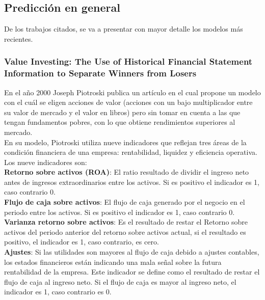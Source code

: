 \subsection{Predicci\'on en general}

De los trabajos citados, se va a presentar con mayor detalle los modelos m\'as recientes.\\

\subsubsection{Value Investing: The Use of Historical Financial Statement Information to Separate Winners from Losers}

En el año 2000 Joseph Piotroski publica un artículo \cite{Piotroski2000} en el cual propone un modelo con el cuál se eligen acciones de valor (acciones con un bajo multiplicador entre su valor de mercado y el valor en libros) pero sin tomar en cuenta a las que tengan fundamentos pobres, con lo que obtiene rendimientos superiores al mercado.\\

En su modelo, Piotroski utiliza nueve indicadores que reflejan tres áreas de la condición financiera de una empresa: rentabilidad, liquidez y eficiencia operativa.\\

Los nueve indicadores son:\\

\textbf{Retorno sobre activos (ROA)}: El ratio resultado de dividir el ingreso neto antes de ingresos extraordinarios entre los activos. Si es positivo el indicador es 1, caso contrario 0.\\

\textbf{Flujo de caja sobre activos}: El flujo de caja generado por el negocio en el periodo entre los activos. Si es positivo el indicador es 1, caso contrario 0.\\

\textbf{Varianza retorno sobre activos}: Es el resultado de restar el Retorno sobre activos del periodo anterior del retorno sobre activos actual, si el resultado es positivo, el indicador es 1, caso contrario, es cero.\\

\textbf{Ajustes}: Si las utilidades son mayores al flujo de caja debido a ajustes contables, los estados financieros están indicando una mala señal sobre la futura rentabilidad de la empresa. Este indicador se define como el resultado de restar el flujo de caja al ingreso neto. Si el flujo de caja es mayor al ingreso neto, el indicador es 1, caso contrario es 0.\\

